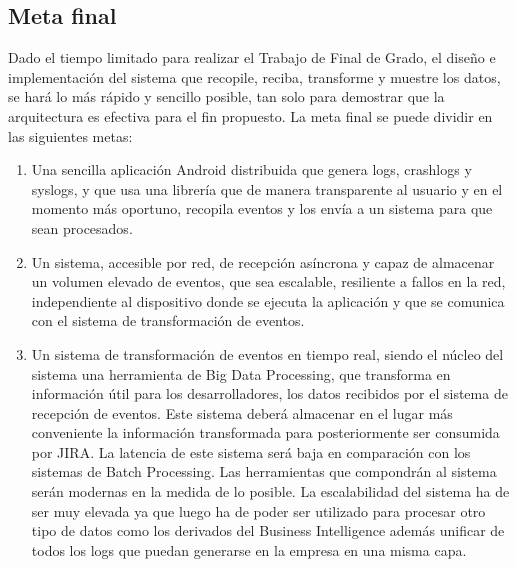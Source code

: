 \subsection{Meta final}
Dado el tiempo limitado para realizar el Trabajo de Final de Grado, el diseño e implementación del sistema que recopile, reciba, transforme y muestre los datos, se hará lo más rápido y sencillo posible, tan solo para demostrar que la arquitectura es efectiva para el fin propuesto. La meta final se puede dividir en las siguientes metas:

\begin{enumerate}
	
	\item Una sencilla aplicación Android distribuida que genera logs, crashlogs y syslogs, y que usa una librería que de manera transparente al usuario y en el momento más oportuno, recopila eventos y los envía a un sistema para que sean procesados. 
	
	\item Un sistema, accesible por red, de recepción asíncrona y capaz de almacenar un volumen elevado de eventos, que sea escalable, resiliente a fallos en la red, independiente al dispositivo donde se ejecuta la aplicación y que se comunica con el sistema de transformación de eventos.
	
	\item Un sistema de transformación de eventos en tiempo real, siendo el núcleo del sistema una herramienta de Big Data Processing, que transforma en información útil para los desarrolladores, los datos recibidos por el sistema de recepción de eventos. Este sistema deberá almacenar en el lugar más conveniente la información transformada para posteriormente ser consumida por JIRA. La latencia de este sistema será baja en comparación con los sistemas de Batch Processing. Las herramientas que compondrán al sistema serán modernas en la medida de lo posible. La escalabilidad del sistema ha de ser muy elevada ya que luego ha de poder ser utilizado para procesar otro tipo de datos como los derivados del Business Intelligence además unificar de todos los logs que puedan generarse en la empresa en una misma capa.
	
\end{enumerate}





